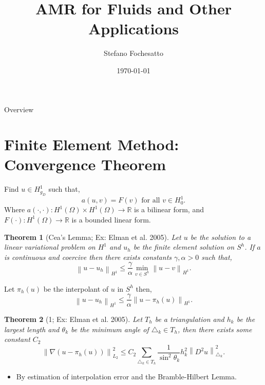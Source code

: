 \documentclass{beamer}
\title{AMR for Fluids and Other Applications}
\author{Stefano Fochesatto}
\institute{University of Alaska Fairbanks}
\date{\today}
\newtheorem{theo}{Theorem}
\newcommand{\norm}[2]{\left \lVert #1 \right \rVert_{#2}}
\begin{document}
 \begin{frame}
\titlepage
\end{frame}


\beamertemplatenavigationsymbolsempty

\begin{frame}{Overview}
	\tableofcontents
\end{frame}


\section{Finite Element Method: Convergence Theorem}
\tableofcontents[currentsection]
  
  \begin{frame}
	\begin{definition}
		Find $u \in H^1_{g_D}$ such that, 
		\begin{equation*}
		  a(u, v) = F(v) \text{ for all } v \in H^1_{0}.
		\end{equation*}
		Where $a(\cdot, \cdot): H^1(\Omega) \times H^1(\Omega) \rightarrow \mathbb{R}$ is a bilinear form, and $F(\cdot): H^1(\Omega) \to \mathbb{R}$ is a bounded linear form.
	\end{definition}

\end{frame}

\begin{frame}
	\begin{theo}[Cea's Lemma; Ex: Elman et al. 2005]
		Let $u$ be the solution to a linear variational problem on $H^1$ and $u_h$ be the finite element solution on $S^h$. If $a$ is continuous and coercive then there exists constants $\gamma, \alpha > 0$ such that,
		\begin{equation*}
		\norm{u - u_h}{H^1} \leq \frac{\gamma}{\alpha} \min_{v \in S^h}\norm{u - v}{H^1}.
	\end{equation*}
\end{theo}
\vfill
Let $\pi_h(u)$ be the interpolant of $u$ in $S^h$ then, 
\begin{equation*}
	\norm{u - u_h}{H^1} \leq \frac{\gamma}{\alpha} \norm{u -\pi_h(u)}{H^1}.
\end{equation*}
\end{frame}





  \begin{frame}
	  \begin{theo}[1; Ex: Elman et al. 2005]
		Let $T_h$ be a triangulation and $h_k$ be the largest length and $\theta_k$ be the minimum angle of $\triangle_k \in T_h$, then there exists some constant $C_2$
		\begin{equation*}
			\norm{\nabla(u - \pi_h(u))}{L_2}^2 \leq C_2\sum_{{\triangle_k}\in {T_h}} \frac{1}{\sin^2 \theta_k} h_k^2 \norm{D^2u}{\triangle_k}^2.
		   \end{equation*}
	  \end{theo}
	  \begin{itemize}
		\item By estimation of interpolation error and the Bramble-Hilbert Lemma. 
	  \end{itemize}
  \end{frame}
\end{document}
